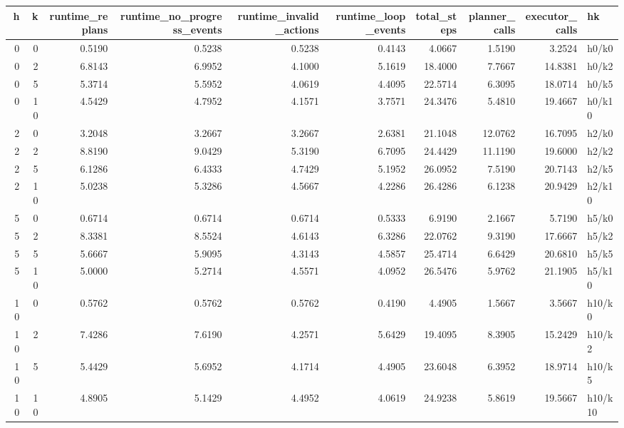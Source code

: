 \begin{tabular}{rrrrrrrrrl}
\toprule
h & k & runtime_replans & runtime_no_progress_events & runtime_invalid_actions & runtime_loop_events & total_steps & planner_calls & executor_calls & hk \\
\midrule
0 & 0 & 0.5190 & 0.5238 & 0.5238 & 0.4143 & 4.0667 & 1.5190 & 3.2524 & h0/k0 \\
0 & 2 & 6.8143 & 6.9952 & 4.1000 & 5.1619 & 18.4000 & 7.7667 & 14.8381 & h0/k2 \\
0 & 5 & 5.3714 & 5.5952 & 4.0619 & 4.4095 & 22.5714 & 6.3095 & 18.0714 & h0/k5 \\
0 & 10 & 4.5429 & 4.7952 & 4.1571 & 3.7571 & 24.3476 & 5.4810 & 19.4667 & h0/k10 \\
2 & 0 & 3.2048 & 3.2667 & 3.2667 & 2.6381 & 21.1048 & 12.0762 & 16.7095 & h2/k0 \\
2 & 2 & 8.8190 & 9.0429 & 5.3190 & 6.7095 & 24.4429 & 11.1190 & 19.6000 & h2/k2 \\
2 & 5 & 6.1286 & 6.4333 & 4.7429 & 5.1952 & 26.0952 & 7.5190 & 20.7143 & h2/k5 \\
2 & 10 & 5.0238 & 5.3286 & 4.5667 & 4.2286 & 26.4286 & 6.1238 & 20.9429 & h2/k10 \\
5 & 0 & 0.6714 & 0.6714 & 0.6714 & 0.5333 & 6.9190 & 2.1667 & 5.7190 & h5/k0 \\
5 & 2 & 8.3381 & 8.5524 & 4.6143 & 6.3286 & 22.0762 & 9.3190 & 17.6667 & h5/k2 \\
5 & 5 & 5.6667 & 5.9095 & 4.3143 & 4.5857 & 25.4714 & 6.6429 & 20.6810 & h5/k5 \\
5 & 10 & 5.0000 & 5.2714 & 4.5571 & 4.0952 & 26.5476 & 5.9762 & 21.1905 & h5/k10 \\
10 & 0 & 0.5762 & 0.5762 & 0.5762 & 0.4190 & 4.4905 & 1.5667 & 3.5667 & h10/k0 \\
10 & 2 & 7.4286 & 7.6190 & 4.2571 & 5.6429 & 19.4095 & 8.3905 & 15.2429 & h10/k2 \\
10 & 5 & 5.4429 & 5.6952 & 4.1714 & 4.4905 & 23.6048 & 6.3952 & 18.9714 & h10/k5 \\
10 & 10 & 4.8905 & 5.1429 & 4.4952 & 4.0619 & 24.9238 & 5.8619 & 19.5667 & h10/k10 \\
\bottomrule
\end{tabular}
